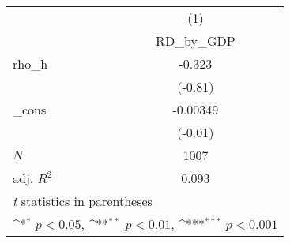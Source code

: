 {
\def\sym#1{\ifmmode^{#1}\else\(^{#1}\)\fi}
\begin{tabular}{l*{1}{c}}
\toprule
            &\multicolumn{1}{c}{(1)}\\
            &\multicolumn{1}{c}{RD\_by\_GDP}\\
\midrule
rho\_h       &      -0.323         \\
            &     (-0.81)         \\
\addlinespace
\_cons      &    -0.00349         \\
            &     (-0.01)         \\
\midrule
\(N\)       &        1007         \\
adj. \(R^{2}\)&       0.093         \\
\bottomrule
\multicolumn{2}{l}{\footnotesize \textit{t} statistics in parentheses}\\
\multicolumn{2}{l}{\footnotesize \sym{*} \(p<0.05\), \sym{**} \(p<0.01\), \sym{***} \(p<0.001\)}\\
\end{tabular}
}
